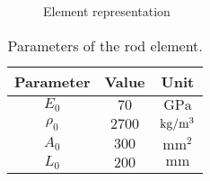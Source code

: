 \begin{figure}[h]
    \centering
    \def\he{4}

    \caption{Element representation}
    \label{fig:element_representation}
\end{figure}

\begin{table}[H]
    \centering
    \begin{tabular}{|c|c|c|}
        \hline
        \textbf{Parameter} & \textbf{Value} & \textbf{Unit}                    \\ \hline
        $E_0$              & $70$           & $\text{GPa}$                     \\ \hline
        $\rho_0$           & $2700$         & $\text{kg/m\textsuperscript{3}}$ \\ \hline
        $A_0$              & $300$          & $\text{mm}^2$                    \\ \hline
        $L_0$              & $200$          & $\text{mm}$                      \\ \hline
    \end{tabular}
    \caption{Parameters of the rod element.}
    \label{tab:parameters_of_the_system}
\end{table}
